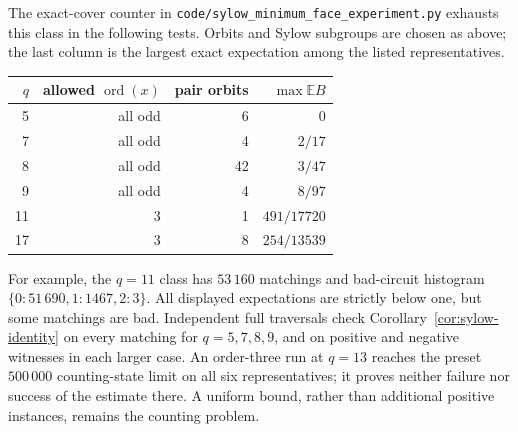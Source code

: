 \documentclass[11pt,a4paper]{article}
\theoremstyle{definition}
\theoremstyle{remark}
\newcommand{\ord}{\operatorname{ord}}
\begin{document}
The exact-cover counter in \texttt{code/sylow\_minimum\_face\_experiment.py} exhausts this class in the following tests.  Orbits and Sylow subgroups are chosen as above; the last column is the largest exact expectation among the listed representatives.
\begin{center}
\begin{tabular}{rrrr}
\toprule
$q$ & allowed $\ord(x)$ & pair orbits & $\max\mathbb E B$\\
\midrule
5 & all odd & 6 & $0$\\
7 & all odd & 4 & $2/17$\\
8 & all odd & 42 & $3/47$\\
9 & all odd & 4 & $8/97$\\
11 & $3$ & 1 & $491/17720$\\
17 & $3$ & 8 & $254/13539$\\
\bottomrule
\end{tabular}
\end{center}
For example, the $q=11$ class has $53\,160$ matchings and bad-circuit histogram $\{0:51\,690,1:1467,2:3\}$.  All displayed expectations are strictly below one, but some matchings are bad.  Independent full traversals check Corollary~\ref{cor:sylow-identity} on every matching for $q=5,7,8,9$, and on positive and negative witnesses in each larger case.  An order-three run at $q=13$ reaches the preset $500\,000$ counting-state limit on all six representatives; it proves neither failure nor success of the estimate there.  A uniform bound, rather than additional positive instances, remains the counting problem.
\end{document}

